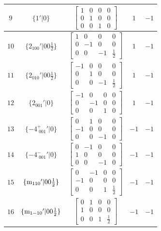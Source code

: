 \documentclass[fleqn,8pt]{jsarticle}
\begin{document}
\begin{longtable}{ccccc}
$ 9 $ & $ \{1{}'|0\} $ & $ \begin{bmatrix} 1 & 0 & 0 & 0 \\ 0 & 1 & 0 & 0 \\ 0 & 0 & 1 & 0 \end{bmatrix} $ & $ 1 $ & $ -1 $ \\ \hline
$ 10 $ & $ \{2{}_{100}{}'|0 0 \frac{1}{2}\} $ & $ \begin{bmatrix} 1 & 0 & 0 & 0 \\ 0 & -1 & 0 & 0 \\ 0 & 0 & -1 & \frac{1}{2} \end{bmatrix} $ & $ 1 $ & $ -1 $ \\ \hline
$ 11 $ & $ \{2{}_{010}{}'|0 0 \frac{1}{2}\} $ & $ \begin{bmatrix} -1 & 0 & 0 & 0 \\ 0 & 1 & 0 & 0 \\ 0 & 0 & -1 & \frac{1}{2} \end{bmatrix} $ & $ 1 $ & $ -1 $ \\ \hline
$ 12 $ & $ \{2{}_{001}{}'|0\} $ & $ \begin{bmatrix} -1 & 0 & 0 & 0 \\ 0 & -1 & 0 & 0 \\ 0 & 0 & 1 & 0 \end{bmatrix} $ & $ 1 $ & $ -1 $ \\ \hline
$ 13 $ & $ \{-4^{+}_{\,\,001}{}'|0\} $ & $ \begin{bmatrix} 0 & 1 & 0 & 0 \\ -1 & 0 & 0 & 0 \\ 0 & 0 & -1 & 0 \end{bmatrix} $ & $ -1 $ & $ -1 $ \\ \hline
$ 14 $ & $ \{-4^{-}_{\,\,001}{}'|0\} $ & $ \begin{bmatrix} 0 & -1 & 0 & 0 \\ 1 & 0 & 0 & 0 \\ 0 & 0 & -1 & 0 \end{bmatrix} $ & $ -1 $ & $ -1 $ \\ \hline
$ 15 $ & $ \{{\rm m}_{110}{}'|0 0 \frac{1}{2}\} $ & $ \begin{bmatrix} 0 & -1 & 0 & 0 \\ -1 & 0 & 0 & 0 \\ 0 & 0 & 1 & \frac{1}{2} \end{bmatrix} $ & $ -1 $ & $ -1 $ \\ \hline
$ 16 $ & $ \{{\rm m}_{1-10}{}'|0 0 \frac{1}{2}\} $ & $ \begin{bmatrix} 0 & 1 & 0 & 0 \\ 1 & 0 & 0 & 0 \\ 0 & 0 & 1 & \frac{1}{2} \end{bmatrix} $ & $ -1 $ & $ -1 $ \\
\end{longtable}
\end{document}
